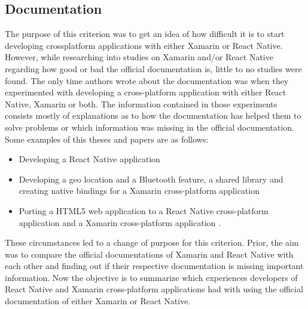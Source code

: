\documentclass[Bachelor,BIF,english]{twbook}
\begin{document}
\subsection{Documentation}
The purpose of this criterion was to get an idea of how difficult it is to start developing crossplatform applications with either Xamarin or React Native. However, while researching into studies on Xamarin and/or React Native regarding how good or bad the official documentation is, little to no studies were found. The only time authors wrote about the documentation was when they experimented with developing a cross-platform application with either React Native, Xamarin or both. The information contained in those experiments consists mostly of explanations as to how the documentation has helped them to solve problems or which information was missing in the official documentation. Some examples of this theses and papers are as follows:
\begin{itemize}
\item Developing a React Native application \cite[p.~16-18]{Danielsson_2016}
\item Developing a geo location and a Bluetooth feature, a shared library and creating native bindings for a Xamarin cross-platform application \cite[p.~10-15]{Dickson_2013} 
\item Porting a HTML5 web application to a React Native cross-platform application and a Xamarin cross-platform application \cite[p.~33-69]{ZubaBernhard2017EdPb}.
\end{itemize}
These circumstances led to a change of purpose for this criterion. Prior, the aim was to compare the official documentations of Xamarin and React Native with each other and finding out if their respective documentation is missing important information. Now the objective is to summarize which experiences developers of React Native and Xamarin cross-platform applications had with using the official documentation of either Xamarin or React Native.
\end{document}
